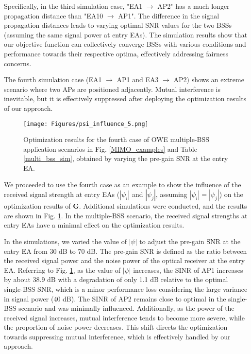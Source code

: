 \par
Specifically, in the third simulation case, "EA1 $\rightarrow$ AP2" has a much longer propagation distance than "EA10 $\rightarrow$ AP1". The difference in the signal propagation distances leads to varying optimal SNR values for the two BSSs (assuming the same signal power at entry EAs). The simulation results show that our objective function can collectively converge BSSs with various conditions and performance towards their respective optima, effectively addressing fairness concerns.
\par
The fourth simulation case (EA1 $\rightarrow$ AP1 and EA3 $\rightarrow$ AP2) shows an extreme scenario where two APs are positioned adjacently. Mutual interference is inevitable, but it is effectively suppressed after deploying the optimization results of our approach.

\begin{figure}
\centering
\texttt{[image: Figures/psi\_influence\_5.png]}
\caption{Optimization results for the fourth case of OWE multiple-BSS application scenarios in Fig. \ref{MIMO_examples} and Table \ref{multi_bss_sim}, obtained by varying the pre-gain SNR at the entry EA.}
\label{psi_influence}
\vspace{-0.5cm}
\end{figure}
\par
We proceeded to use the fourth case as an example to show the influence of the received signal strength at entry EAs ($|\psi_i|$ and $|\psi_j|$, assuming $|\psi_i| = |\psi_j|$) on the optimization results of $\mathbf{G}$. Additional simulations were conducted, and the results are shown in Fig. \ref{psi_influence}.
In the multiple-BSS scenario, the received signal strengths at entry EAs have a minimal effect on the optimization results.
\par
In the simulations, we varied the value of $|\psi|$ to adjust the pre-gain SNR at the entry EA from 30 dB to 70 dB. The pre-gain SNR is defined as the ratio between the received signal power and the noise power of the optical receiver at the entry EA. Referring to Fig. \ref{psi_influence}, as the value of $|\psi|$ increases, the SINR of AP1 increases by about 38.9 dB with a degradation of only 1.1 dB relative to the optimal single-BSS SNR, which is a minor performance loss considering the large variance in signal power (40 dB). The SINR of AP2 remains close to optimal in the single-BSS scenario and was minimally influenced.
Additionally, as the power of the received signal increases, mutual interference tends to become more severe, while the proportion of noise power decreases. This shift directs the optimization towards suppressing mutual interference, which is effectively handled by our approach.